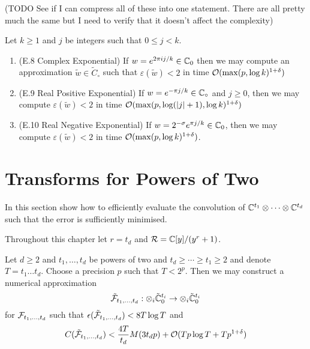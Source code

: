 (TODO See if I can compress all of these into one statement. There are all pretty much the same but I need to verify that it doesn't affect the complexity)

\begin{lemma}
    Let $k \ge 1$ and $j$ be integers such that $0 \le j < k$.
    \begin{enumerate}
        \item (E.8 Complex Exponential) If $w = e^{2\pi i j / k} \in {\mathbb C}_0$ then we may compute an approximation $\tilde{w} \in \tilde{C}_\circ$ such that $\varepsilon(\tilde{w}) < 2$ in time $\mathcal O(\max(p, \log k)^{1 + \delta})$
        \item (E.9 Real Positive Exponential) If $w = e^{-\pi j / k} \in {\mathbb C}_\circ$ and $j \ge 0$, then we may compute $\varepsilon(\tilde{w}) < 2$ in time $\mathcal O(\max(p, \log (|j| + 1), \log k)^{1 + \delta})$
        \item (E.10 Real Negative Exponential) If $w = 2^{- \sigma} e^{\pi j / k} \in {\mathbb C}_0$, then we may compute $\varepsilon(\tilde{w}) < 2$ in time $\mathcal O(\max(p, \log k)^{1 + \delta})$.
    \end{enumerate}
\end{lemma}

\section{Transforms for Powers of Two}
\label{sec:transfoms-for-powers-of-two}

In this section show how to efficiently evaluate the convolution of ${\mathbb C}^{t_1} \otimes \cdots \otimes {\mathbb C}^{t_d}$ such that the error is sufficiently minimised.

Throughout this chapter let $r = t_d$ and $\mathcal R = {\mathbb C}[y] / (y^r + 1)$.

\begin{theorem}\label{thm:main-3}
    Let $d \geq 2$ and $t_1, \ldots, t_d$ be powers of two and $t_d \geq \cdots \geq t_1 \geq 2$ and denote $T = t_1 \ldots t_d$. Choose a precision $p$ such that $T < 2^p$. Then we may construct a numerical approximation
    \[
        \tilde {\mathcal F}_{t_1, \ldots, t_d} : \otimes_i \tilde{{\mathbb C}}^{t_i}_0 \to \otimes_i \tilde{{\mathbb C}}^{t_i}_0
    \]
    for $\mathcal F_{t_1, \ldots, t_d}$ such that $\epsilon(\tilde{\mathcal F}_{t_1, \ldots, t_d}) < 8 T \log T$ and
    \[
        C(\tilde{\mathcal F}_{t_1, \ldots, t_d}) < \frac{4T}{t_d} M(3t_d p) + \mathcal O(Tp\log T + Tp^{1 + \delta})
    \]
\end{theorem}

